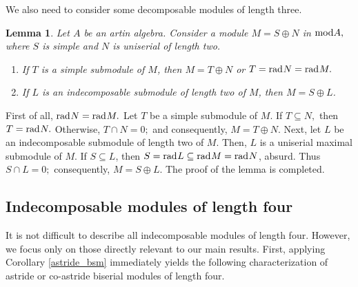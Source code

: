 \documentclass[10pt]{amsart}
\newtheorem{Lemma}[Theo]{Lemma}
\theoremstyle{definition}
\newcommand{\mmod}{{\rm mod}}
\newcommand{\rad}{{\rm rad}\hspace{.5pt}}
\newcommand{\vp}{\vspace{.5pt}}
\begin{document}
\smallskip

We also need to consider some decomposable modules of length three.

\vp

\begin{Lemma}\label{dec_mod_l3} Let $A$ be an artin algebra. Consider a module $M=S\oplus N$ in $\mmod A,$ where $S$ is simple and $N$ is uniserial of length two. 

\begin{enumerate}[$(1)$]

\vspace{-3pt}

\item If $T$ is a simple submodule of $M$, then $M=T\oplus N$ or $T=\rad N=\rad M.$ 

\item If $L$ is an indecomposable submodule of length two of $M$, then $M=S\oplus L$.

\end{enumerate}\end{Lemma} 

\vspace{-1.5pt}

 First of all, $\rad N=\rad M.$ Let $T$ be a simple submodule of $M$. If $T\subseteq N,$ then $T=\rad N.$ Otherwise, $T\cap N=0;$ and consequently, $M=T\oplus N.$ Next, let $L$ be an indecomposable submodule of length two of $M$. Then, $L$ is a uniserial maximal submodule of $M$. If $S\subseteq L$, then $S=\rad L \subseteq \rad M=\rad N$, absurd. Thus $S\cap L=0;$ consequently, $M=S\oplus L.$ The proof of the lemma is completed.


\subsection{\sc Indecomposable modules of length four} It is not difficult to describe all indecomposable modules of length four. However, %
we focus only on those directly relevant to our main results. First, applying Corollary \ref{astride_bsm} immediately yields the following characterization of astride or co-astride biserial modules of length four.
\end{document}
